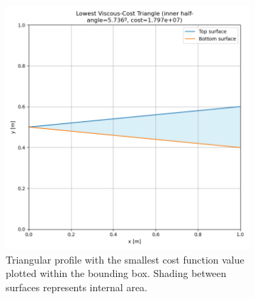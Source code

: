 \documentclass[11pt]{article}
\begin{document}
\begin{figure}[H]
\begin{subfigure}[b]{0.45\textwidth}
    \includegraphics[width=\linewidth]{../results/viscous/lowest_cost_triangle.png}
    \caption{Triangular profile with the smallest cost function value plotted within the bounding box. Shading between surfaces represents internal area.}
    \label{fig:vis-triangle-b}
\end{subfigure}
\caption{}
\label{fig:vis-triangle}
\end{figure}
\end{document}
